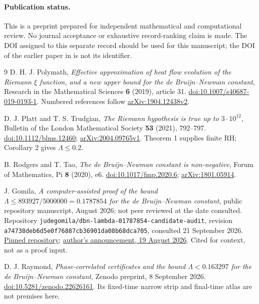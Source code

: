 \documentclass[11pt,a4paper]{article}
\begin{document}
\paragraph{Publication status.}
This is a preprint prepared for independent mathematical and computational
review. No journal acceptance or exhaustive record-ranking claim is made.
The DOI assigned to this separate record should be used for this manuscript;
the DOI of the earlier paper in \cite{raymond} is not its identifier.
\begin{thebibliography}{9}
\setlength{\itemsep}{5pt}
D. H. J. Polymath,
\emph{Effective approximation of heat flow evolution of the Riemann
$\xi$ function, and a new upper bound for the de Bruijn--Newman constant},
Research in the Mathematical Sciences \textbf{6} (2019), article 31.
\href{https://doi.org/10.1007/s40687-019-0193-1}{doi:10.1007/s40687-019-0193-1}.
Numbered references follow
\href{https://arxiv.org/abs/1904.12438v2}{arXiv:1904.12438v2}.

D. J. Platt and T. S. Trudgian,
\emph{The Riemann hypothesis is true up to $3\cdot10^{12}$},
Bulletin of the London Mathematical Society \textbf{53} (2021), 792--797.
\href{https://doi.org/10.1112/blms.12460}{doi:10.1112/blms.12460};
\href{https://arxiv.org/abs/2004.09765v1}{arXiv:2004.09765v1}.
Theorem 1 supplies finite RH; Corollary 2 gives $\Lambda\le0.2$.

B. Rodgers and T. Tao,
\emph{The de Bruijn--Newman constant is non-negative},
Forum of Mathematics, Pi \textbf{8} (2020), e6.
\href{https://doi.org/10.1017/fmp.2020.6}{doi:10.1017/fmp.2020.6};
\href{https://arxiv.org/abs/1801.05914}{arXiv:1801.05914}.

J. Gomila,
\emph{A computer-assisted proof of the bound
$\Lambda\le893927/5000000=0.1787854$ for the de Bruijn--Newman constant},
public repository manuscript, August 2026; not peer reviewed at the date
consulted. Repository \texttt{judegomila/dbn-lambda-01787854-candidate-audit},
revision \nolinkurl{a74738deb6d5e0f76887cb36901da08b68dca705},
consulted 21 September 2026.
\href{https://github.com/judegomila/dbn-lambda-01787854-candidate-audit/tree/a74738deb6d5e0f76887cb36901da08b68dca705}{Pinned repository};
\href{https://www.judegomila.com/posts/riemann-lambda-0.1787854}{author's announcement, 19 August 2026}.
Cited for context, not as a proof input.

D. J. Raymond,
\emph{Phase-correlated certificates and the bound $\Lambda<0.163297$
for the de Bruijn--Newman constant}, Zenodo preprint, 8 September 2026.
\href{https://doi.org/10.5281/zenodo.22626161}{doi:10.5281/zenodo.22626161}.
Its fixed-time narrow strip and final-time atlas are not premises here.


\end{thebibliography}
\end{document}
